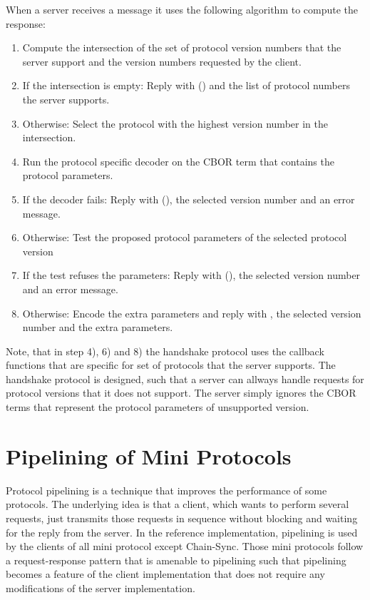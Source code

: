 \documentclass{report}
\newcommand{\wip}[1]{}
\newcommand{\wip}[1]{\color{magenta}{#1}\color{black}}
\theoremstyle{definition}{
  \newtheorem{lemma}{Lemma}[section] %
  \newtheorem{definition}[lemma]{Definition}
}
\theoremstyle{theorem}{
  \newtheorem{invariant}[lemma]{Invariant}
  \newtheorem{proofobligation}[lemma]{Proof Obligation}
}
\numberwithin{equation}{lemma}
\begin{document}
When a server receives a \ProposeVersions{} message it uses the following algorithm to
compute the response:
\begin{enumerate}
\item
  Compute the intersection of the set of protocol version numbers that the server support
  and the version numbers requested by the client.
\item
  If the intersection is empty:
  Reply with \Refuse(\VersionMismatch) and the list of protocol numbers the server supports.
\item
  Otherwise:
  Select the protocol with the highest version number in the intersection.
\item
  Run the protocol specific decoder on the CBOR term that contains the protocol parameters.
\item
  If the decoder fails:
  Reply with \Refuse(\HandshakeDecodeError), the selected version number and an error message.
\item
  Otherwise: Test the proposed protocol parameters of the selected protocol version
\item
  If the test refuses the parameters:
  Reply with \Refuse(\Refused), the selected version number and an error message.
\item
  Otherwise:
  Encode the extra parameters and
  reply with \AcceptVersion, the selected version number and the extra parameters.
\end{enumerate}
Note, that in step 4), 6) and 8) the handshake protocol uses the callback functions that are specific
for set of protocols that the server supports.
The handshake protocol is designed,
such that a server can allways handle requests for protocol versions that it does not support.
The server simply ignores the CBOR terms that represent the protocol parameters of unsupported
version.

\wip{
see in the code if this is still true:
The handshake mini protocol runs before the MUX/DEMUX itself is initialized.
Each message is transmitted within a single MUX segment, i.e. with a proper segment header,
but, as the MUX/DEMUX is not yet running the messages must not be split into multiple segments.
}

\section{Pipelining of Mini Protocols}
\label{pipelining}
Protocol pipelining is a technique that improves the performance of some protocols.
The underlying idea is that a client, which wants to perform several requests,
just transmits those requests in sequence without blocking and waiting for the reply from the server.
In the reference implementation, pipelining is used by the clients of all mini protocol except Chain-Sync.
Those mini protocols follow a request-response pattern that is amenable to pipelining such
that pipelining becomes a feature of the client implementation that does not require any
modifications of the server implementation.
\end{document}

